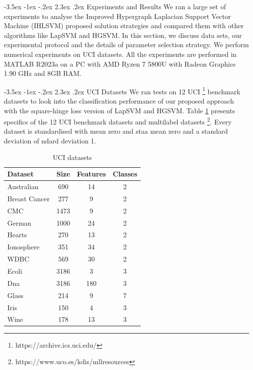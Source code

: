 \documentclass[12pt,a4paper,oneside,english]{report}
\makeatletter
\renewcommand\section{\@startsection {section}{1}{\z@}%
                                   {-3.5ex \@plus -1ex \@minus -.2ex}%
                                   {2.3ex \@plus.2ex}%
                                   {\centering\normalfont\LARGE\bfseries}}
\renewcommand\subsection{\@startsection {subsection}{1}{\z@}%
                                   {-3.5ex \@plus -1ex \@minus -.2ex}%
                                   {2.3ex \@plus.2ex}%
                                   {\centering\normalfont\Large\bfseries}}
\makeatother
\begin{document}
\section{Experiments and Results}
We ran a large set of experiments to analyse the Improved Hypergraph Laplacian Support Vector Machine (IHLSVM) proposed solution strategies and compared them with other algorithms like LapSVM and HGSVM. In this section, we discuss data sets, our experimental protocol and the details of parameter selection strategy. We perform numerical experiments on UCI datasets. All the experiments are performed in MATLAB R2023a on a PC with AMD Ryzen 7 5800U with Radeon Graphics 1.90 GHz and 8GB RAM.

\subsection{UCI Datasets}
We ran tests on 12 UCI \footnote{https://archive.ics.uci.edu/} benchmark datasets to look into the classification performance of our proposed approach with the square-hinge loss version of LapSVM and HGSVM. Table \ref{table:1} presents specifics of the 12 UCI benchmark datasets and multilabel datasets \footnote{https://www.uco.es/kdis/mllresources}. Every dataset is standardised with mean zero and staa mean zero and a standard deviation of ndard deviation 1.


\begin{table}[htbp]
\caption{UCI datasets}
\begin{center}
\begin{tabular}{|l|c|c|c|}
\hline
\textbf{Dataset } & \textbf{ Size }& \textbf{ Features }& \textbf{ Classes } \\
\hline
Australian & 690 & 14 & 2 \\ 
 Breast Cancer & 277 & 9 & 2 \\
 CMC & 1473 & 9 & 2 \\
 German & 1000 & 24 & 2 \\
 Hearts & 270 & 13 & 2 \\
 Ionosphere & 351 & 34 & 2 \\
 WDBC & 569 & 30 & 2 \\
 Ecoli & 3186 & 3 & 3 \\
 Dna & 3186  & 180 & 3 \\
 Glass & 214 & 9 & 7 \\
 Iris & 150 & 4 & 3 \\
 Wine & 178 & 13 & 3 \\
\hline
\end{tabular}
\label{table:1}
\end{center}
\end{table}
\end{document}
